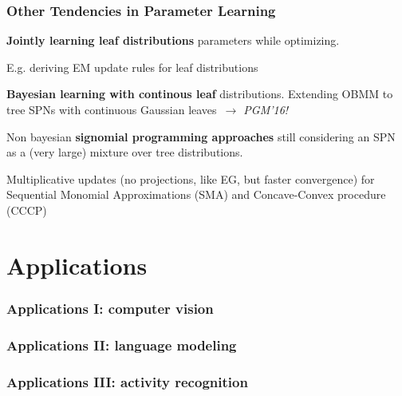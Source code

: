 \documentclass[10pt, t, xcolor={usenames,dvipsnames,svgnames}, compress]{beamer}
\begin{document}
\begin{frame}
  \frametitle{Other Tendencies in Parameter Learning}
  \textbf{Jointly learning leaf distributions} parameters while optimizing.\par
  E.g. deriving EM update rules for leaf distributions~\parencites{Peharz2015,Desana2016}\par\bigskip
  
   \textbf{Bayesian learning with continous leaf}
  distributions. Extending OBMM to tree SPNs with continuous Gaussian
  leaves~\parencite{Jaini2016}{\color{gold2}\emph{$\rightarrow$
    PGM'16!}}\par\bigskip

  Non bayesian \textbf{signomial programming approaches} still
  considering an SPN as a (very large)
  mixture over tree distributions.\par
  Multiplicative updates (no projections, like EG, but faster convergence) for Sequential
  Monomial Approximations (SMA) and Concave-Convex procedure (CCCP)~\parencite{Zhao2016b}\par\bigskip
\end{frame}


\section{Applications}
{
  \begin{frame}[c]
    \sectionpage
  \end{frame}
}

\begin{frame}
  \frametitle{Applications I: computer vision}
  
\end{frame}


\begin{frame}
  \frametitle{Applications II: language modeling}
  
\end{frame}

\begin{frame}
  \frametitle{Applications III: activity recognition}
\end{frame}
\end{document}
